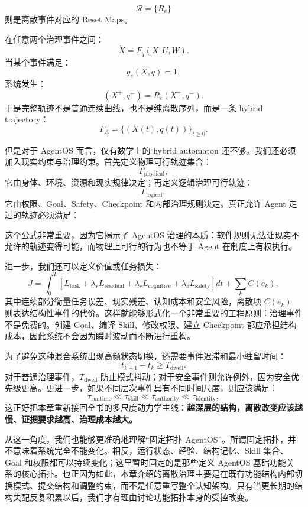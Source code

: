 \[
\mathcal R=\{R_e\}
\]
则是离散事件对应的 Reset Maps。

在任意两个治理事件之间：
\[
\dot X
=
F_q(X,U,W).
\]
当某个事件满足：
\[
g_e(X,q)=1,
\]
系统发生：
\[
(X^+,q^+)
=
R_e(X^-,q^-).
\]
于是完整轨迹不是普通连续曲线，也不是纯离散序列，而是一条 hybrid trajectory：
\[
\Gamma_A
=
\{
(X(t),q(t))
\}_{t\ge0}.
\]

但是对于 AgentOS 而言，仅有数学上的 hybrid automaton 还不够。我们还必须加入现实约束与治理约束。首先定义物理可行轨迹集合：
\[
\Gamma_{\mathrm{physical}},
\]
它由身体、环境、资源和现实规律决定；再定义逻辑治理可行轨迹：
\[
\Gamma_{\mathrm{logical}},
\]
它由权限、Goal、Safety、Checkpoint 和内部治理规则决定。真正允许 Agent 走过的轨迹必须满足：
\begin{statementbox}
\centering
{}
\end{statementbox}
这个公式非常重要，因为它揭示了 AgentOS 治理的本质：软件规则无法让现实不允许的轨迹变得可能，而物理上可行的行为也不等于 Agent 在制度上有权执行。

进一步，我们还可以定义价值或任务损失：
\[
J
=
\int_0^T
\left[
L_{\mathrm{task}}
+
\lambda_r L_{\mathrm{residual}}
+
\lambda_c L_{\mathrm{cognitive}}
+
\lambda_s L_{\mathrm{safety}}
\right]dt
+
\sum_k
C(e_k),
\]
其中连续部分衡量任务误差、现实残差、认知成本和安全风险，离散项 \(C(e_k)\) 则表达结构性事件的代价。这样就能够形式化一个非常重要的工程原则：治理事件不是免费的。创建 Goal、编译 Skill、修改权限、建立 Checkpoint 都应承担结构成本，因此系统不会因为瞬时波动而不断进行重构。

为了避免这种混合系统出现高频状态切换，还需要事件迟滞和最小驻留时间：
\[
t_{k+1}-t_k
\ge
T_{\mathrm{dwell}}.
\]
对于普通治理事件，\(T_{\mathrm{dwell}}\) 防止模式抖动；对于安全事件则允许例外，因为安全优先级更高。更进一步，如果不同层次事件具有不同时间尺度，则应该满足：
\[
\tau_{\mathrm{runtime}}
\ll
\tau_{\mathrm{skill}}
\ll
\tau_{\mathrm{authority}}
\ll
\tau_{\mathrm{identity}},
\]
这正好把本章重新接回全书的多尺度动力学主线：\textbf{越深层的结构，离散改变应该越慢、证据要求越高、治理成本越大。}

从这一角度，我们也能够更准确地理解“固定拓扑 AgentOS”。所谓固定拓扑，并不意味着系统完全不能变化。相反，运行状态、经验、结构记忆、Skill 集合、Goal 和权限都可以持续变化；这里暂时固定的是那些定义 AgentOS 基础功能关系的核心拓扑。也正因为如此，本章介绍的离散治理主要是在既有功能结构内部切换模式、提交结构和调整约束，而不是任意重写整个认知架构。只有当更长期的结构失配反复积累以后，我们才有理由讨论功能拓扑本身的受控改变。


